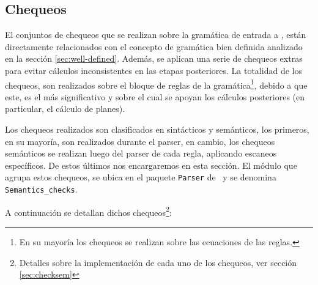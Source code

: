 \subsection*{Chequeos}
\label{subsec:check}

El conjuntos de chequeos que se realizan sobre la gramática de entrada a \maggen, están directamente relacionados con el concepto de gramática bien definida analizado en la sección \ref{sec:well-defined}. Además, se aplican una serie de chequeos extras para evitar cálculos inconsistentes en las etapas posteriores. La totalidad de los chequeos, son realizados sobre el bloque de reglas de la gramática\footnote{En su mayoría los chequeos se realizan sobre las ecuaciones de las reglas.}, debido a que este, es el más significativo y sobre el cual se apoyan los cálculos posteriores (en particular, el cálculo de planes).

Los chequeos realizados son clasificados en sintácticos y semánticos, los primeros, en su mayoría, son realizados durante el parser, en cambio, los chequeos semánticos se realizan luego del parser de cada regla, aplicando escaneos específicos. De estos últimos nos encargaremos en esta sección.
El módulo que agrupa estos chequeos, se ubica en el paquete \texttt{Parser} de \maggen\ y se denomina \texttt{Semantics\_checks}.

A continuación se detallan dichos chequeos\footnote{Detalles sobre la implementación de cada uno de los chequeos, ver sección \ref{sec:checksem}}:

